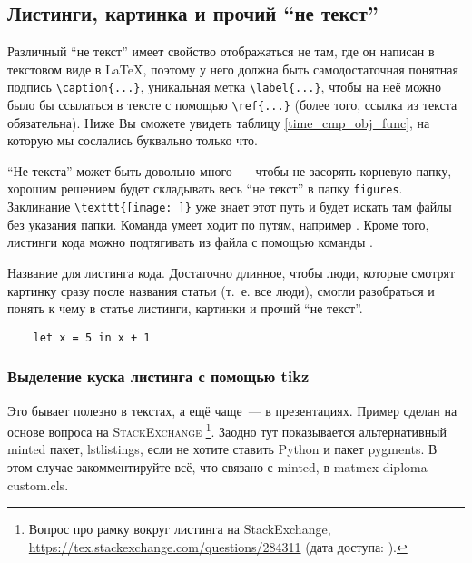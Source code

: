 \subsection{Листинги, картинка и прочий \enquote{не текст}}

Различный \enquote{не текст} имеет свойство отображаться не там, где он написан в текстовом виде в \LaTeX{}, поэтому у него должна быть самодостаточ\-ная понятная подпись \verb=\caption{...}=, уникальная метка \verb=\label{...}=, чтобы на неё можно было бы ссылаться в тексте с помощью \verb=\ref{...}= (более того, ссылка из текста обязательна).
Ниже Вы сможете увидеть таблицу \ref{time_cmp_obj_func}, на которую мы сослались буквально только что.

\enquote{Не текста} может быть довольно много~--- чтобы не засорять корневую папку, хорошим решением будет складывать весь \enquote{не текст} в папку \texttt{figures}.
Заклинание \verb=\texttt{[image: ]}= уже знает этот путь и будет искать там файлы без указания папки.
Команда \verb== умеет ходит по путям, например \verb==.
Кроме того, листинги кода можно подтягивать из файла с помощью команды \verb==.


\begin{listing}
    \caption{Название для листинга кода. Достаточно длинное, чтобы люди, которые смотрят картинку сразу после названия статьи (т.~е. все люди), смогли разобраться и понять к чему в статье листинги, картинки и прочий \enquote{не текст}.}
    \begin{verbatim}
    let x = 5 in x + 1
  \end{verbatim}
\end{listing}

\subsubsection{Выделение куска листинга с помощью tikz}
Это бывает полезно в текстах, а ещё чаще~--- в презентациях.
Пример сделан на основе вопроса на \textsc{StackExchange}%
\footnote{Вопрос про рамку вокруг листинга на StackExchange, \url{https://tex.stackexchange.com/questions/284311} (дата доступа: ).}.
Заодно тут показывается альтернативный minted пакет, lstlistings, если не хотите ставить Python и пакет pygments.
В этом случае закомментируйте всё, что связано с minted, в matmex-diploma-custom.cls.

